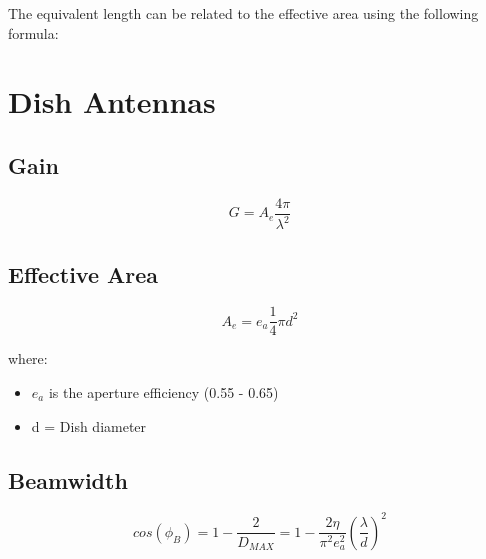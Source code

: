 The equivalent length can be related to the effective area using the following formula:







\section{Dish Antennas} %
\label{sec:dish_antennas}

\subsection{Gain} %
\label{sub:gain}

\begin{equation}
	G=A_e\frac{4 \pi}{\lambda^2}
\end{equation}




\subsection{Effective Area} %
\label{sub:effective_area}



\begin{equation}
	A_e = e_a \frac{1}{4} \pi d^2
\end{equation}

where:

\begin{itemize}
	\item $e_a$ is the aperture efficiency (0.55 - 0.65) 
	\item d = Dish diameter
\end{itemize}




\subsection{Beamwidth} %
\label{sub:beamwidth}

\begin{equation}
	cos(\phi_B)=  1- \frac{2}{D_{MAX}}=  1 - \frac {2\eta} {\pi^2 e_a^2} \left( \frac{\lambda}{d} \right)^2
\end{equation}





